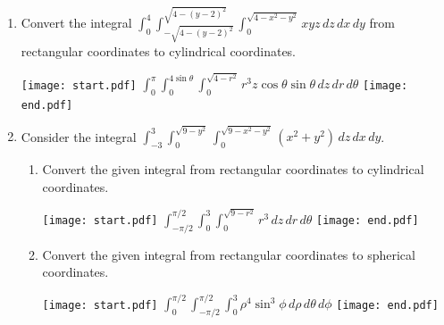 \documentclass[12pt]{article}
\begin{document}
\begin{enumerate}
\item Convert the integral $\int_0^4 \int_{-\sqrt{4-(y-2)^2}}^{\sqrt{4-(y-2)^2}} \int_0^{\sqrt{4-x^2-y^2}} xyz \,dz\,dx\,dy$ from rectangular coordinates to cylindrical coordinates.

\texttt{[image: start.pdf]}
{{$\int_0^\pi \int_0^{4\sin{\theta}} \int_0^{\sqrt{4-r^2}} r^3z\cos{\theta}\sin{\theta} \,dz\,dr\,d\theta$}}
\texttt{[image: end.pdf]}


\item Consider the integral $\int_{-3}^3 \int_0^{\sqrt{9-y^2}} \int_0^{\sqrt{9-x^2-y^2}} (x^2+y^2) \,dz\,dx\,dy$.

\begin{enumerate}

\item Convert the given integral from rectangular coordinates to cylindrical coordinates.

\texttt{[image: start.pdf]}
{{$\int_{-\pi/2}^{\pi/2} \int_0^3 \int_0^{\sqrt{9-r^2}} r^3 \,dz\,dr\,d\theta$}}
\texttt{[image: end.pdf]}


\item Convert the given integral from rectangular coordinates to spherical coordinates.

\texttt{[image: start.pdf]}
{{$\int_0^{\pi/2} \int_{-\pi/2}^{\pi/2} \int_0^3 \rho^4\sin^3{\phi}\,d\rho\,d\theta\,d\phi$}}
\texttt{[image: end.pdf]}


\end{enumerate}

\end{enumerate}
\end{document}
